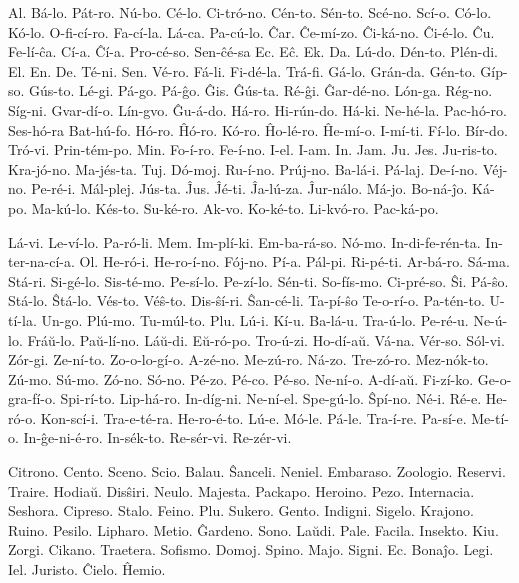 Al. Bá-lo. Pát-ro. Nú-bo. Cé-lo. Ci-tró-no. Cén-to. Sén-to. Scé-no. Scí-o. Có-lo. Kó-lo. O-fi-cí-ro. Fa-cí-la. Lá-ca. Pa-cú-lo. Ĉar. Ĉe-mí-zo. Ĉi-ká-no. Ĉi-é-lo. Ĉu. Fe-lí-ĉa. Cí-a. Ĉí-a. Pro-cé-so. Sen-ĉé-sa Ec. Eĉ. Ek. Da. Lú-do. Dén-to. Plén-di. El. En. De. Té-ni. Sen. Vé-ro. Fá-li. Fi-dé-la. Trá-fi. Gá-lo. Grán-da. Gén-to. Gíp-so. Gús-to. Lé-gi. Pá-go. Pá-ĝo. Ĝis. Ĝús-ta. Ré-ĝi. Ĝar-dé-no. Lón-ga. Rég-no. Síg-ni. Gvar-dí-o. Lín-gvo. Ĝu-á-do. Há-ro. Hi-rún-do. Há-ki. Ne-hé-la. Pac-hó-ro. Ses-hó-ra Bat-hú-fo. Hó-ro. Ĥó-ro. Kó-ro. Ĥo-lé-ro. Ĥe-mí-o. I-mí-ti. Fí-lo. Bír-do. Tró-vi. Prin-tém-po. Min. Fo-í-ro. Fe-í-no. I-el. I-am. In. Jam. Ju. Jes. Ju-ris-to. Kra-jó-no. Ma-jés-ta. Tuj. Dó-moj. Ru-í-no. Prúj-no. Ba-lá-i. Pá-laj. De-í-no. Véj-no. Pe-ré-i. Mál-plej. Jús-ta. Ĵus. Ĵé-ti. Ĵa-lú-za. Ĵur-nálo. Má-jo. Bo-ná-ĵo. Ká-po. Ma-kú-lo. Kés-to. Su-ké-ro. Ak-vo. Ko-ké-to. Li-kvó-ro. Pac-ká-po.


Lá-vi. Le-ví-lo. Pa-ró-li. Mem. Im-plí-ki. Em-ba-rá-so. Nó-mo. In-di-fe-rén-ta. In-ter-na-cí-a. Ol. He-ró-i. He-ro-í-no. Fój-no. Pí-a. Pál-pi. Ri-pé-ti. Ar-bá-ro. Sá-ma. Stá-ri. Si-gé-lo. Sis-té-mo. Pe-sí-lo. Pe-zí-lo. Sén-ti. So-fís-mo. Ci-pré-so. Ŝi. Pá-ŝo. Stá-lo. Ŝtá-lo. Vés-to. Véŝ-to. Dis-ŝí-ri. Ŝan-cé-li. Ta-pí-ŝo Te-o-rí-o. Pa-tén-to. U-tí-la. Un-go. Plú-mo. Tu-múl-to. Plu. Lú-i. Kí-u. Ba-lá-u. Tra-ú-lo. Pe-ré-u. Ne-ú-lo. Fráŭ-lo. Paŭ-lí-no. Láŭ-di. Eŭ-ró-po. Tro-ú-zi. Ho-dí-aŭ. Vá-na. Vér-so. Sól-vi. Zór-gi. Ze-ní-to. Zo-o-lo-gí-o. A-zé-no. Me-zú-ro. Ná-zo. Tre-zó-ro. Mez-nók-to. Zú-mo. Sú-mo. Zó-no. Só-no. Pé-zo. Pé-co. Pé-so. Ne-ní-o. A-dí-aŭ. Fi-zí-ko. Ge-o-gra-fí-o. Spi-rí-to. Lip-há-ro. In-díg-ni. Ne-ní-el. Spe-gú-lo. Ŝpí-no. Né-i. Ré-e. He-ró-o. Kon-scí-i. Tra-e-té-ra. He-ro-é-to. Lú-e. Mó-le. Pá-le. Tra-í-re. Pa-sí-e. Me-tí-o. In-ĝe-ni-é-ro. In-sék-to. Re-sér-vi. Re-zér-vi.


Citrono. Cento. Sceno. Scio. Balau. Ŝanceli. Neniel. Embaraso. Zoologio. Reservi. Traire. Hodiaŭ. Disŝiri. Neulo. Majesta. Packapo. Heroino. Pezo. Internacia. Seshora. Cipreso. Stalo. Feino. Plu. Sukero. Gento. Indigni. Sigelo. Krajono. Ruino. Pesilo. Lipharo. Metio. Ĝardeno. Sono. Laŭdi. Pale. Facila. Insekto. Kiu. Zorgi. Cikano. Traetera. Sofismo. Domoj. Spino. Majo. Signi. Ec. Bonaĵo. Legi. Iel. Juristo. Ĉielo. Ĥemio.

